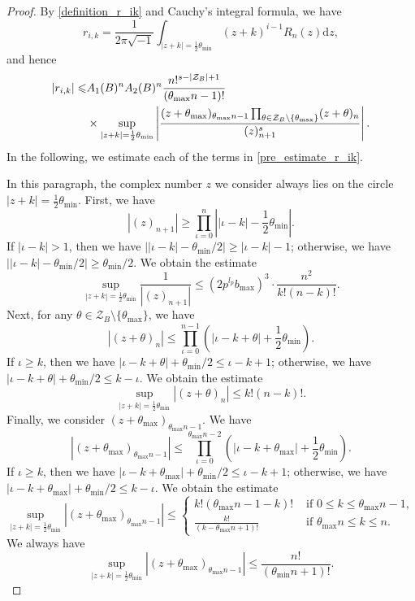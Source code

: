 \documentclass[12pt]{article}
\numberwithin{equation}{section}
\begin{document}
\begin{proof}
By \eqref{definition_r_ik} and Cauchy's integral formula, we have
\[ r_{i,k} = \frac{1}{2\pi \sqrt{-1}} \int_{|z+k|=\frac{1}{2}\theta_{\min}} (z+k)^{i-1}R_n(z) \mathrm{d}z, \]
and hence
\begin{align}
|r_{i,k}| \leqslant &A_1(B)^nA_2(B)^n \frac{n!^{s-|\mathcal{Z}_B|+1}}{(\theta_{\max}n-1)!} \notag\\ 
&\times \sup_{|z+k|=\frac{1}{2}\theta_{\min}}\left| \frac{(z+\theta_{\max})_{\theta_{\max}n-1}\prod_{\theta\in\mathcal{Z}_B\setminus\{\theta_{\max}\}}(z+\theta)_{n}}{(z)_{n+1}^s} \right|. \label{pre_estimate_r_ik}
\end{align}
In the following, we estimate each of the terms in \eqref{pre_estimate_r_ik}.

In this paragraph, the complex number $z$ we consider always lies on the circle $|z+k| = \frac{1}{2}\theta_{\min}$. First, we have
\[ |(z)_{n+1}| \geqslant \prod_{\iota = 0}^{n} \left|  |\iota-k|-\frac{1}{2}\theta_{\min} \right|. \]
If $|\iota-k|>1$, then we have $\left|  |\iota-k|-\theta_{\min}/2 \right| \geqslant |\iota-k| - 1$; otherwise, we have $\left|  |\iota-k|-\theta_{\min}/2 \right| \geqslant \theta_{\min}/2$. We obtain the estimate
\begin{equation}\label{r_ik_estimate_part_1}
	\sup_{|z+k|=\frac{1}{2}\theta_{\min}} \frac{1}{|(z)_{n+1}|} \leqslant (2p^{l_p}b_{\max})^3 \cdot \frac{n^2}{k!(n-k)!}.
\end{equation}
Next, for any $\theta \in \mathcal{Z}_B\setminus\{\theta_{\max}\}$, we have 
\[|(z+\theta)_{n}| \leqslant \prod_{\iota=0}^{n-1} \left( |\iota-k+\theta|+\frac{1}{2}\theta_{\min} \right). \]
If $\iota \geqslant k$, then we have $|\iota-k+\theta|+\theta_{\min}/2 \leqslant \iota - k + 1$; otherwise, we have $|\iota-k+\theta|+\theta_{\min}/2 \leqslant k-\iota$. We obtain the estimate
\begin{equation}\label{r_ik_estimate_part_2}
	\sup_{|z+k|=\frac{1}{2}\theta_{\min}} |(z+\theta)_{n}| \leqslant  k!(n-k)!.
\end{equation}
Finally, we consider $(z+\theta_{\max})_{\theta_{\max}n-1}$. We have
\[ |(z+\theta_{\max})_{\theta_{\max}n-1}| \leqslant \prod_{\iota=0}^{\theta_{\max}n-2} \left( |\iota-k+\theta_{\max}| + \frac{1}{2}\theta_{\min} \right). \]
If $\iota \geqslant k$, then we have $|\iota-k+\theta_{\max}|+\theta_{\min}/2 \leqslant \iota - k + 1$; otherwise, we have $|\iota-k+\theta_{\max}|+\theta_{\min}/2 \leqslant k-\iota$. We obtain the estimate
\[ \sup_{|z+k|=\frac{1}{2}\theta_{\min}}|(z+\theta_{\max})_{\theta_{\max}n-1}| \leqslant 
\begin{cases} 
	k!(\theta_{\max}n-1-k)! &\text{~if~} 0 \leqslant k \leqslant \theta_{\max}n-1, \\
	\frac{k!}{(k-\theta_{\max}n+1)!} &\text{~if~} \theta_{\max}n \leqslant k \leqslant n.
\end{cases} \]
We always have
\begin{equation}\label{r_ik_estimate_part_3}
	\sup_{|z+k|=\frac{1}{2}\theta_{\min}}|(z+\theta_{\max})_{\theta_{\max}n-1}| \leqslant \frac{n!}{(\theta_{\min}n+1)!}.
\end{equation}


\end{proof}
\end{document}
